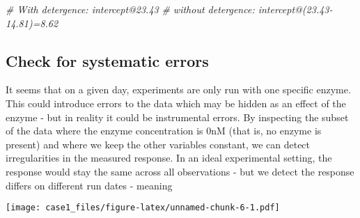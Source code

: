 \documentclass[
]{article}
\newenvironment{Shaded}{\begin{snugshade}}{\end{snugshade}}
\newcommand{\CommentTok}[1]{\textcolor[rgb]{0.56,0.35,0.01}{\textit{#1}}}
\newcommand{\DataTypeTok}[1]{\textcolor[rgb]{0.13,0.29,0.53}{#1}}
\newcommand{\DecValTok}[1]{\textcolor[rgb]{0.00,0.00,0.81}{#1}}
\newcommand{\KeywordTok}[1]{\textcolor[rgb]{0.13,0.29,0.53}{\textbf{#1}}}
\newcommand{\NormalTok}[1]{#1}
\newcommand{\OperatorTok}[1]{\textcolor[rgb]{0.81,0.36,0.00}{\textbf{#1}}}
\newcommand{\StringTok}[1]{\textcolor[rgb]{0.31,0.60,0.02}{#1}}
\begin{document}
\begin{Shaded}
\begin{Highlighting}[]
\CommentTok{# With detergence:    intercept@23.43}
\CommentTok{# without detergence: intercept@(23.43-14.81)=8.62}
\end{Highlighting}
\end{Shaded}

\hypertarget{check-for-systematic-errors}{%
\subsection{Check for systematic
errors}\label{check-for-systematic-errors}}

It seems that on a given day, experiments are only run with one specific
enzyme. This could introduce errors to the data which may be hidden as
an effect of the enzyme - but in reality it could be instrumental
errors. By inspecting the subset of the data where the enzyme
concentration is 0nM (that is, no enzyme is present) and where we keep
the other variables constant, we can detect irregularities in the
measured response. In an ideal experimental setting, the response would
stay the same across all observations - but we detect the response
differs on different run dates - meaning

\begin{Shaded}
\end{Shaded}

\texttt{[image: case1\_files/figure-latex/unnamed-chunk-6-1.pdf]}
\end{document}
